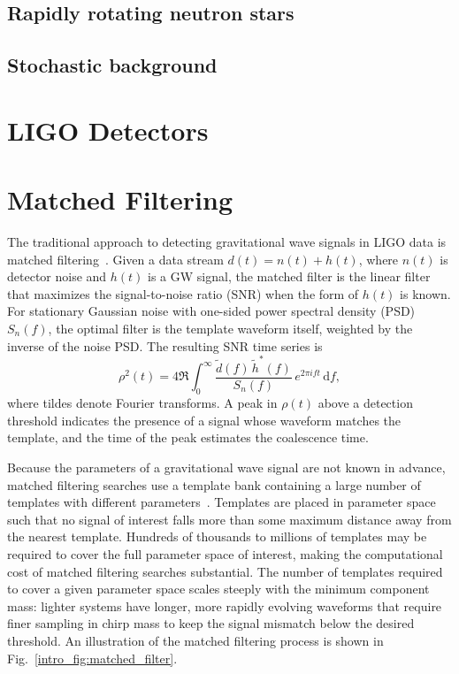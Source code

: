 \subsection{Rapidly rotating neutron stars}

\subsection{Stochastic background}

\section{LIGO Detectors}
\label{intro_sec:detectors}

\section{Matched Filtering}
\label{intro_sec:matched_filter}

The traditional approach to detecting gravitational wave signals in LIGO data is matched filtering~\cite{CuFl1994}.
Given a data stream $d(t) = n(t) + h(t)$, where $n(t)$ is detector noise and $h(t)$ is a GW signal, the matched filter is the linear filter that maximizes the signal-to-noise ratio (SNR) when the form of $h(t)$ is known.
For stationary Gaussian noise with one-sided power spectral density (PSD) $S_n(f)$, the optimal filter is the template waveform itself, weighted by the inverse of the noise PSD.
The resulting SNR time series is
\begin{equation}
    \rho^2(t) = 4 \Re \int_0^\infty \frac{\tilde{d}(f)\, \tilde{h}^*(f)}{S_n(f)}\, e^{2\pi i f t}\, \mathrm{d}f,
\end{equation}
where tildes denote Fourier transforms.
A peak in $\rho(t)$ above a detection threshold indicates the presence of a signal whose waveform matches the template, and the time of the peak estimates the coalescence time.

Because the parameters of a gravitational wave signal are not known in advance, matched filtering searches use a template bank containing a large number of templates with different parameters~\cite{Owe1996}.
Templates are placed in parameter space such that no signal of interest falls more than some maximum distance away from the nearest template.
Hundreds of thousands to millions of templates may be required to cover the full parameter space of interest, making the computational cost of matched filtering searches substantial.
The number of templates required to cover a given parameter space scales steeply with the minimum component mass: lighter systems have longer, more rapidly evolving waveforms that require finer sampling in chirp mass to keep the signal mismatch below the desired threshold.
An illustration of the matched filtering process is shown in Fig.~\ref{intro_fig:matched_filter}.

